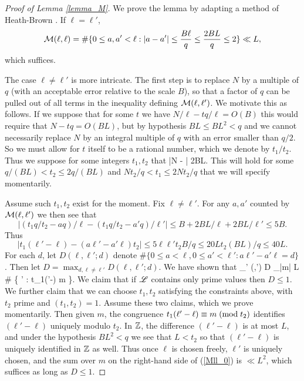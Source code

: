 \documentclass[oneside,11pt]{amsart}
\begin{document}
\begin{proof}[Proof of Lemma \ref{lemma_M}]
We prove the lemma by adapting a method of Heath-Brown \cite[\S 4]{HB12}.
If $\ell = \ell'$, 
\[ \mathcal{M}(\ell,\ell) =  \# \{ 0 \leq a,a' < \ell : |a - a'| \leq \frac{B \ell}{q} \leq \frac{2BL}{q} \leq 2\} \ll L, 
\]
which suffices.


The case  $\ell \neq \ell'$ is more intricate. The first step is to replace $N$ by a multiple of $q$ (with an acceptable error relative to the scale $B$), so that a factor of $q$ can be pulled out of all terms in the inequality defining $\mathcal{M}(\ell,\ell')$. 
We motivate this as follows.
 If we suppose that for some $t$ we have $N/\ell - tq/\ell = O(B)$ this would require that $N-tq = O(BL)$, but by hypothesis $BL\leq BL^2< q$ and we cannot necessarily   replace $N$ by an integral multiple of $q$ with an error smaller than $ q/2$.  So we must allow for $t$ itself to be a rational number, which we denote by $t_1/t_2$. Thus we suppose for some integers $t_1,t_2$ that  
 \beq\label{Nbb}
 |N -  | \leq 2BL.
 \eeq
 This will hold for some $q/(BL) < t_2 \leq 2q/(BL)$ and $ Nt_2/q < t_1 \leq 2Nt_2/q$ that we will specify momentarily.

Assume such $t_1,t_2$ exist for the moment. Fix $\ell \neq \ell'$. For any  $a,a'$ counted by $\mathcal{M}(\ell,\ell')$ we then see that
\[ | (t_1q/t_2 - aq)/\ell - (t_1q/t_2 - a'q)/\ell' | \leq B + 2BL/\ell + 2BL/\ell' \leq 5B. \]
Thus 
\[  |t_1(\ell' - \ell)  - (a\ell' - a'\ell)t_2| \leq 5 \ell \ell' t_2B/q  \leq 20 L t_2 (BL)/q \leq 40 L.  \]
For each $d$, let $D(\ell,\ell';d)$ denote $\# \{ 0 \leq a < \ell, 0 \leq a' < \ell' : a\ell' - a' \ell = d\}$. Then let $D = \max_{d,\ell \neq \ell'} D(\ell,\ell';d)$. 
We have shown that
 \beq\label{Mll_0}
 \sum_{\ell \neq \ell' \in \Lscr} \Mcal (\ell,\ell') \ll D \sum_{|m|  L} \# \{ \ell \neq \ell' \in \Lscr : t_1(\ell'-\ell) \con m \}.
 \eeq
 We claim that if $\mathscr{L}$ contains only prime values then $D \leq 1$. 
 We further claim that we can choose $t_1,t_2$ satisfying the constraints above, with $t_2$  prime and $(t_1,t_2)=1$. 
 Assume these two claims, which we prove momentarily. Then given $m$, the congruence $t_1 (\ell' - \ell) \equiv m \; ( \text{mod} \; t_2)$ identifies $(\ell' - \ell)$ uniquely modulo $t_2$.
In $\mathbb{Z}$, the difference $(\ell' - \ell)$ is at most $L$, and under the hypothesis $BL^2<q$ we see that $L <t_2$ so that   $(\ell' - \ell)$ is uniquely identified in $\mathbb{Z}$ as well. Thus once $\ell$ is chosen freely, $\ell'$ is uniquely chosen, and the sum over $m$ on the right-hand side of (\ref{Mll_0}) is $\ll L^2$, which suffices as long as $D \leq 1$. 


\end{proof}
\end{document}
